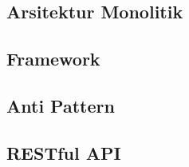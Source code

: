 \subsection{Arsitektur Monolitik}

\subsection{Framework}

\subsection{Anti Pattern}

\subsection{RESTful API}